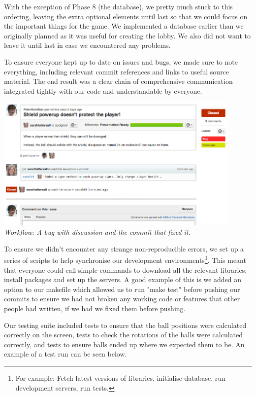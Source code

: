 \documentclass[a4wide, 11pt]{article}
\begin{document}
With the exception of Phase 8 (the database), we pretty much stuck to this ordering, leaving the extra optional elements until last so that we could focus on the important things for the game.
We implemented a database earlier than we originally planned as it was useful for creating the lobby. We also did not want to leave it until last in case we encountered any problems.

To ensure everyone kept up to date on issues and bugs, we made sure to note everything, including relevant commit references and links to useful source material. The end result was a clear chain of comprehensive communication integrated tightly with our code and understandable by everyone. 

\begin{center}

  \includegraphics[width=0.9\textwidth]{images/git_issue.png} \\
  \emph{Workflow: A bug with discussion and the commit that fixed it.}
\end{center}
      
To ensure we didn't encounter any strange non-reproducible errors, we set up a series of scripts to help synchronise our development environments\footnote{For example: Fetch latest versions of libraries, initialise database, run development servers, run tests.}. This meant that everyone could call simple commands to download all the relevant libraries, install packages and set up the servers. A good example of this is we added an option to our makefile which allowed us to run "make test" before pushing our commits to ensure we had not broken any working code or features that other people had written, if we had we fixed them before pushing.

Our testing suite included tests to ensure that the ball positions were calculated correctly on the screen, tests to check the rotations of the balls were calculated correctly, and tests to ensure balls ended up where we expected them to be. An example of a test run can be seen below.
\end{document}
